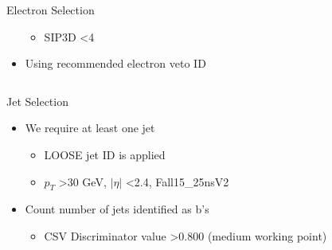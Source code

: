 \documentclass{beamer}
\begin{document}
\begin{frame}
\begin{columns}
\begin{block}{Electron Selection}
\begin{adjustwidth}{-0.5em}{-0.5em}
\begin{itemize}
\begin{itemize}
\item SIP3D \textless 4
\end{itemize}
\item Using recommended electron veto ID
\end{itemize}
\vspace{.1cm}
\end{adjustwidth}
\end{block}
\end{columns}
\begin{block}{Jet Selection}
\vspace{0.2cm}
 \tiny
  \begin{itemize}
\item We require at least one jet
\begin{itemize}
\tiny
\item LOOSE jet ID is applied
\item $ p_{T}$ \textgreater 30 GeV, $|\eta|$ \textless 2.4, Fall15\_25nsV2 
\end{itemize}
\item Count number of jets identified as b's
\begin{itemize}
\tiny
\item CSV Discriminator value \textgreater 0.800 (medium working point)
\end{itemize}
\end{itemize}
\vspace{.1cm}
\end{block}
\end{frame}
\end{document}
